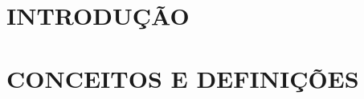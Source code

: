 \documentclass[
	12pt,				%
    oneside,			%
	a4paper,			%
	chapter=TITLE,		%
	english,			%
	brazil				%
	]{abntex2}
\begin{document}



\renewcommand{\contentsname}{Sumário}
\tableofcontents*
\cleardoublepage



\textual
\chapter{INTRODUÇÃO}


\chapter{CONCEITOS E DEFINIÇÕES}

\end{document}

